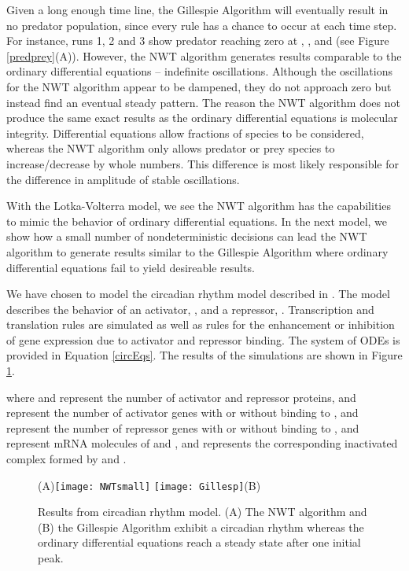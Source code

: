 \documentclass[copyright]{eptcs}
\newcommand{\noi}{\noindent}
\begin{document}
Given a long enough time line, the Gillespie Algorithm will eventually result in no predator population, since every rule has a chance to occur at each time step.  For instance, runs 1, 2 and 3 show predator reaching zero at  , \hbox{}, and   (see Figure \ref{predprey}(A)).  However, the NWT algorithm generates results comparable to the ordinary differential equations -- indefinite oscillations.  Although the oscillations for the NWT algorithm appear to be dampened, they do not approach zero but instead find an eventual steady pattern.  The reason the NWT algorithm does not produce the same exact results as the ordinary differential equations is molecular integrity.  Differential equations allow fractions of species to be considered, whereas the NWT algorithm only allows predator or prey species to increase/decrease by whole numbers. This difference is most likely responsible for the difference in amplitude of stable oscillations.

With the Lotka-Volterra model, we see the NWT algorithm has the capabilities to mimic the behavior of ordinary differential equations.  In the next model, we show how a small number of nondeterministic decisions can lead the NWT algorithm to generate results similar to the Gillespie Algorithm where ordinary differential equations fail to yield desireable results.

We have chosen to model the circadian rhythm model described in \cite{vilar02}.  The model describes the behavior of an activator, , and a repressor, .  Transcription and translation rules are simulated as well as rules for the enhancement or inhibition of gene expression due to activator and repressor binding.  The system of ODEs is provided in Equation \ref{circEqs}.  The results of the simulations are shown in Figure \ref{circrhythm}.

\noi where  and  represent the number of activator and repressor proteins,  and  represent the number of activator genes with or without binding to ,  and  represent the number of repressor genes with or without binding to ,  and  represent mRNA molecules of  and , and  represents the corresponding inactivated complex formed by  and .

\begin{figure}[ht]
\centering
(A)\texttt{[image: NWTsmall]}
\texttt{[image: Gillesp]}(B)
\caption{Results from circadian rhythm model.  (A) The NWT algorithm and (B) the Gillespie Algorithm exhibit a circadian rhythm whereas the ordinary differential equations reach a steady state after one initial peak.}
\label{circrhythm}
\end{figure}
\end{document}
